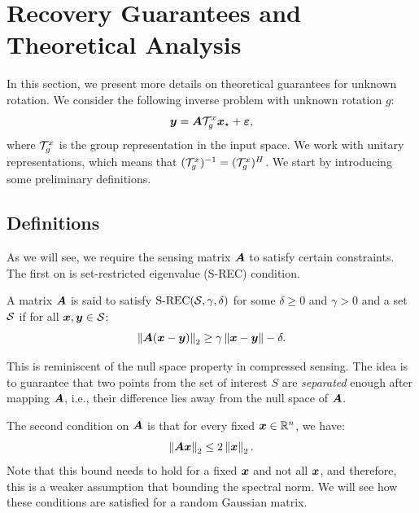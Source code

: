 \section[Recovery Guarantees  and Theoretical Analysis]{Recovery Guarantees  and \\ Theoretical Analysis} \label{appx:theory}
In this section, we present more details on theoretical guarantees for unknown rotation. We consider the following inverse problem with unknown rotation $g$: 
\begin{equation}
    {\bm{y}} = {\bm{A}} {\mathcal{T}}_g^x {\bm{x}}_\star + {\bm{\varepsilon}},
\end{equation}
where ${\mathcal{T}}_g^x$ is the group representation in the input space. We work with unitary representations, which means that $({\mathcal{T}}_g^x)^{-1}=({\mathcal{T}}_g^x)^{H}$. We start by introducing some preliminary definitions.

\subsection{Definitions}
As we will see, we require the sensing matrix ${\bm{A}}$ to satisfy certain constraints. The first on is set-restricted eigenvalue (S-REC) condition.
\begin{definition} A matrix ${\bm{A}}$ is said to satisfy 
$\text{S-REC}({\mathcal{S}},\gamma,\delta)$ for some $\delta\geq 0$ and $\gamma>0$ and a set ${\mathcal{S}}$ if for all ${\bm{x}},{\bm{y}}\in{\mathcal{S}}$:
\[
\left\|{\bm{A}}({\bm{x}}-{\bm{y}})\right\|_2\geq \gamma\left\|{\bm{x}}-{\bm{y}}\right\|-\delta.
\]
\end{definition}
This is reminiscent of the null space property in compressed sensing. The idea is to guarantee that two points from the set of interest $S$ are \textit{separated} enough after mapping ${\bm{A}}$, i.e., their difference lies away from the null space of ${\bm{A}}$. 

The second condition on ${\bm{A}}$ is that for every fixed ${\bm{x}}\in\mathbb{R}^n$, we have:
\begin{equation}
    \norm{\mA\vx}_2\leq 2\norm{\vx}_2.
    \label{eq:norm_condition}
\end{equation}
Note that this bound needs to hold for a fixed ${\bm{x}}$ and not all ${\bm{x}}$, and therefore, this is a weaker assumption that bounding the spectral norm. We will see how these conditions are satisfied for a random Gaussian matrix.




